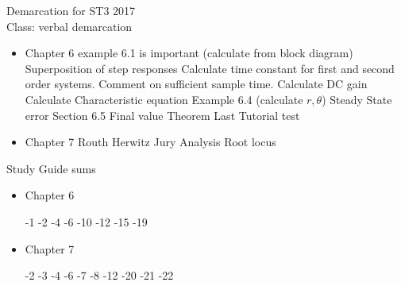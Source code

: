 \documentclass{article}
\begin{document}
{\huge Demarcation for ST3 2017}\\
Class: verbal demarcation\\
\begin{itemize}
	\item Chapter 6
		\subitem example 6.1 is important (calculate from block diagram)
		\subitem Superposition of step responses
		\subitem Calculate time constant for first and second order systems. Comment on sufficient sample time.
		\subitem Calculate DC gain
		\subitem Calculate Characteristic equation
		\subitem Example 6.4 (calculate $r,\theta$)
		\subitem Steady State error
		\subitem Section 6.5
		\subitem Final value Theorem
		\subitem Last Tutorial test
	\item Chapter 7
		\subitem Routh Herwitz
		\subitem Jury Analysis
		\subitem Root locus
	

\end{itemize}
Study Guide sums
\begin{itemize}
	\item Chapter 6
		\begin{multicols}
		-1
		-2
		-4
		-6
		-10
		-12
		-15
		-19
		\end{multicols}
	\item Chapter 7
		\begin{multicols}
		\subitem 7-2
		\subitem 7-3
		\subitem 7-4
		\subitem 7-6
		\subitem 7-7
		\subitem 7-8
		\subitem 7-12
		\subitem 7-20
		\subitem 7-21
		\subitem 7-22
		\end{multicols}
\end{itemize}
\end{document}
